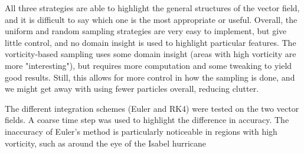 \documentclass{article}
\begin{document}
All three strategies are able to highlight the general structures of the vector field, and it is difficult to say which one
is the most appropriate or useful. Overall, the uniform and random sampling strategies are very easy to implement, but give little control,
and no domain insight is used to highlight particular features. The vorticity-based sampling uses some domain insight (areas with high vorticity are more "interesting"), but
requires more computation and some tweaking to yield good results. Still, this allows for more control in how the sampling is done, and we might
get away with using fewer particles overall, reducing clutter.

The different integration schemes (Euler and RK4) were tested on the two vector fields. A coarse time step was used to highlight the difference in accuracy. The inaccuracy of Euler's method is particularly noticeable in regions with high vorticity, such as around the eye of the Isabel hurricane
\end{document}
